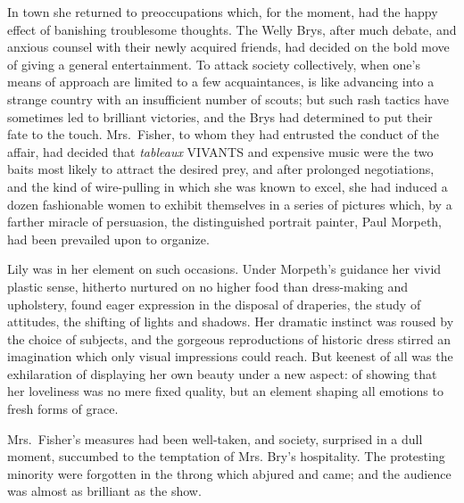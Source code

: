 \documentclass[12pt,a4paper]{book}
\begin{document}
In town she returned to preoccupations which, for the moment, had
the happy effect of banishing troublesome thoughts. The Welly
Brys, after much debate, and anxious counsel with their newly
acquired friends, had decided on the bold move of giving a
general entertainment. To attack society collectively, when one's
means of approach are limited to a few acquaintances, is like
advancing into a strange country with an insufficient number of
scouts; but such rash tactics have sometimes led to brilliant
victories, and the Brys had determined to put their fate to the
touch. Mrs.\ Fisher, to whom they had entrusted the conduct of the
affair, had decided that \textit{tableaux} VIVANTS and expensive music
were the two baits most likely to attract the desired prey, and
after prolonged negotiations, and the kind of wire-pulling in
which she was known to excel, she had induced a dozen fashionable
women to exhibit themselves in a series of pictures which, by a
farther miracle of persuasion, the distinguished portrait
painter, Paul Morpeth, had been prevailed upon to organize.





Lily was in her element on such occasions. Under Morpeth's
guidance her vivid plastic sense, hitherto nurtured on no higher
food than dress-making and upholstery, found eager expression in
the disposal of draperies, the study of attitudes, the shifting
of lights and shadows. Her dramatic instinct was roused by the
choice of subjects, and the gorgeous reproductions of historic
dress stirred an imagination which only visual impressions could
reach. But keenest of all was the exhilaration of displaying her
own beauty under a new aspect: of showing that her loveliness was
no mere fixed quality, but an element shaping all emotions to
fresh forms of grace.





Mrs.\ Fisher's measures had been well-taken, and society,
surprised in a dull moment, succumbed to the temptation of Mrs.
Bry's hospitality. The protesting minority were forgotten in the
throng which abjured and came; and the audience was almost as
brilliant as the show.
\end{document}

